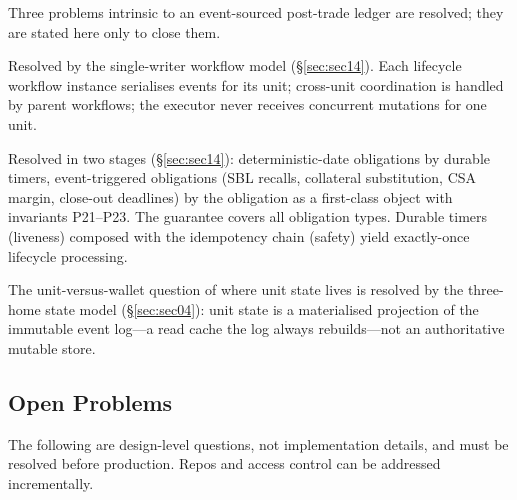 Three problems intrinsic to an event-sourced post-trade ledger are resolved; they are stated here only to close them.

\begin{description}[nosep]
\item[Concurrency.] Resolved by the single-writer workflow model (\S\ref{sec:sec14}). Each lifecycle workflow instance serialises events for its unit; cross-unit coordination is handled by parent workflows; the executor never receives concurrent mutations for one unit.
\item[Liveness.] Resolved in two stages (\S\ref{sec:sec14}): deterministic-date obligations by durable timers, event-triggered obligations (SBL recalls, collateral substitution, CSA margin, close-out deadlines) by the obligation as a first-class object with invariants P21--P23. The guarantee covers all obligation types. Durable timers (liveness) composed with the idempotency chain (safety) yield exactly-once lifecycle processing.
\item[State attachment.] The unit-versus-wallet question of where unit state lives is resolved by the three-home state model (\S\ref{sec:sec04}): unit state is a materialised projection of the immutable event log---a read cache the log always rebuilds---not an authoritative mutable store.
\end{description}

\subsection{Open Problems}

The following are design-level questions, not implementation details, and must be resolved before production. Repos and access control can be addressed incrementally.

